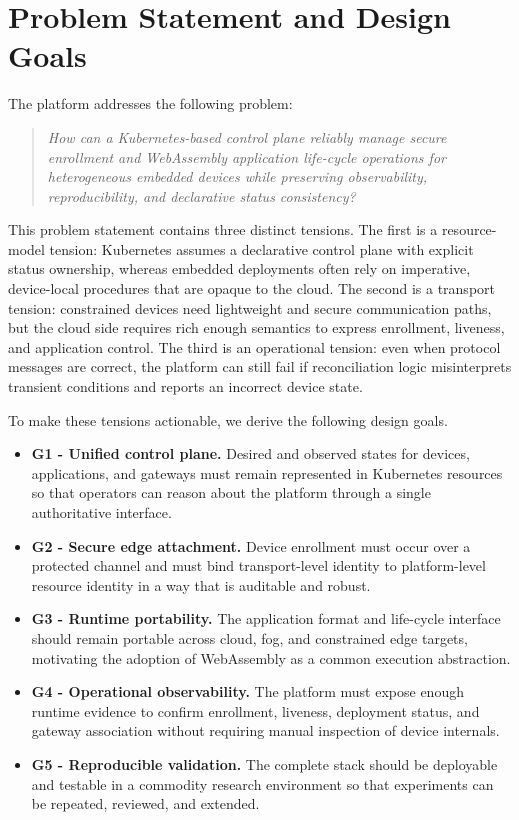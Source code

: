 \section{Problem Statement and Design Goals}

The platform addresses the following problem:
\begin{quote}
\emph{How can a Kubernetes-based control plane reliably manage secure enrollment and WebAssembly application life-cycle operations for heterogeneous embedded devices while preserving observability, reproducibility, and declarative status consistency?}
\end{quote}

This problem statement contains three distinct tensions. The first is a resource-model tension: Kubernetes assumes a declarative control plane with explicit status ownership, whereas embedded deployments often rely on imperative, device-local procedures that are opaque to the cloud. The second is a transport tension: constrained devices need lightweight and secure communication paths, but the cloud side requires rich enough semantics to express enrollment, liveness, and application control. The third is an operational tension: even when protocol messages are correct, the platform can still fail if reconciliation logic misinterprets transient conditions and reports an incorrect device state.

To make these tensions actionable, we derive the following design goals.

\begin{itemize}
    \item \textbf{G1 - Unified control plane.} Desired and observed states for devices, applications, and gateways must remain represented in Kubernetes resources so that operators can reason about the platform through a single authoritative interface.
    \item \textbf{G2 - Secure edge attachment.} Device enrollment must occur over a protected channel and must bind transport-level identity to platform-level resource identity in a way that is auditable and robust.
    \item \textbf{G3 - Runtime portability.} The application format and life-cycle interface should remain portable across cloud, fog, and constrained edge targets, motivating the adoption of WebAssembly as a common execution abstraction.
    \item \textbf{G4 - Operational observability.} The platform must expose enough runtime evidence to confirm enrollment, liveness, deployment status, and gateway association without requiring manual inspection of device internals.
    \item \textbf{G5 - Reproducible validation.} The complete stack should be deployable and testable in a commodity research environment so that experiments can be repeated, reviewed, and extended.
\end{itemize}

